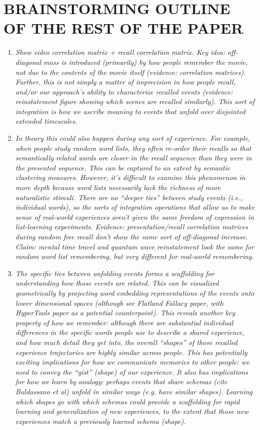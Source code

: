   \section*{BRAINSTORMING OUTLINE OF THE REST OF THE PAPER}
\begin{enumerate}
  \item \textit{Show video correlation matrix + recall correlation matrix.  Key idea: off-diagonal mass is introduced (primarily) by how people \textit{remember} the movie, not due to the contents of the movie itself (evidence: correlation matrices).  Further, this is not simply a matter of imprecision in how people recall, and/or our approach's ability to characterize recalled events (evidence: reinstatement figure showing which scenes are recalled similarly).  This sort of integration is how we ascribe meaning to events that unfold over disjointed extended timescales.}
  \item \textit{In theory this could also happen during \textit{any} sort of experience.  For example, when people study random word lists, they often re-order their recalls so that semantically related words are closer in the recall sequence than they were in the presented sequence.  This can be captured to an extent by semantic clustering measures.  However, it's difficult to examine this phenomenon in more depth because word lists necessarily lack the richness of more naturalistic stimuli.  There are no ``deeper ties'' between study events (i.e., individual words), so the sorts of integration operations that allow us to make sense of real-world experiences aren't given the same freedom of expression in list-learning experiments.  Evidence: presentation/recall correlation matrices during random free recall don't show the same sort of off-diagonal increase.  Claim: mental time travel and quantum wave reinstatement look the same for random word list remembering, but very different for real-world remembering.}
  \item \textit{The specific ties between unfolding events forms a scaffolding for understanding how those events are related.  This can be visualized geometrically by projecting word embedding representations of the events onto lower dimensional spaces (although see Flatland Fallacy paper, with HyperTools paper as a potential counterpoint).  This reveals another key property of how we remember: although there are substantial individual differences in the specific words people use to describe a shared experience, and how much detail they get into, the overall ``shapes'' of those recalled experience trajectories are highly similar across people.  This has potentially exciting implications for how we communicate memories to other people: we need to convey the ``gist'' (shape) of our experience.  It also has implications for how we learn by analogy: perhaps events that share schemas (cite Baldassano et al) unfold in similar ways (e.g. have similar shapes).  Learning which shapes go with which schemas could provide a scaffolding for rapid learning and generalization of new experiences, to the extent that those new experiences match a previously learned schema (shape).}

\end{enumerate}
